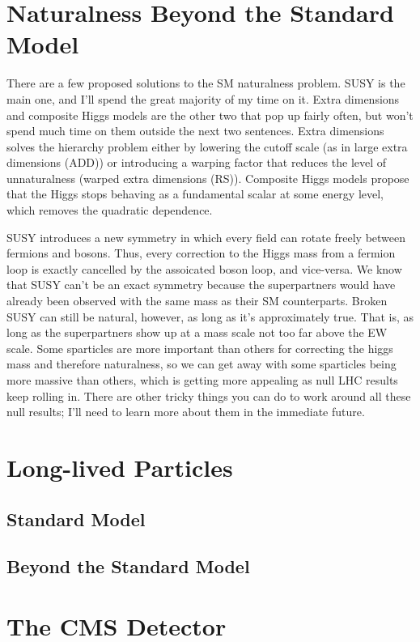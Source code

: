 \documentclass[12pt]{article}
\begin{document}
\section{Naturalness Beyond the Standard Model}
    There are a few proposed solutions to the SM naturalness problem. SUSY is the main one, and I'll spend the great majority of my time on it. Extra dimensions and composite Higgs models are the other two that pop up fairly often, but won't spend much time on them outside the next two sentences. Extra dimensions solves the hierarchy problem either by lowering the cutoff scale (as in large extra dimensions (ADD)) or introducing a warping factor that reduces the level of unnaturalness (warped extra dimensions (RS)). Composite Higgs models propose that the Higgs stops behaving as a fundamental scalar at some energy level, which removes the quadratic dependence.

    SUSY introduces a new symmetry in which every field can rotate freely between fermions and bosons. Thus, every correction to the Higgs mass from a fermion loop is exactly cancelled by the assoicated boson loop, and vice-versa. We know that SUSY can't be an exact symmetry because the superpartners would have already been observed with the same mass as their SM counterparts. Broken SUSY can still be natural, however, as long as it's approximately true. That is, as long as the superpartners show up at a mass scale not too far above the EW scale. Some sparticles are more important than others for correcting the higgs mass and therefore naturalness, so we can get away with some sparticles being more massive than others, which is getting more appealing as null LHC results keep rolling in. There are other tricky things you can do to work around all these null results; I'll need to learn more about them in the immediate future.

\section{Long-lived Particles}
\subsection{Standard Model}
\subsection{Beyond the Standard Model}

\section{The CMS Detector}
\end{document}
